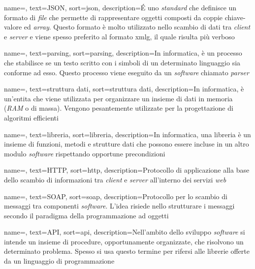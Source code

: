{
    name=,
    text=JSON,
    sort=json,
    description={\'E uno \textit{standard} che definisce un formato di \textit{file} che permette di rappresentare oggetti composti da coppie chiave-valore ed \textit{array}. Questo formato è molto utilizzato nello scambio di dati tra \textit{client} e \textit{server} e viene spesso preferito al formato \gls{xmlg}, il quale risulta più verboso}
}

{
    name=,
    text=parsing,
    sort=parsing,
    description={In informatica, è un processo che stabilisce se un testo scritto con i simboli di un determinato linguaggio sia conforme ad esso. Questo processo viene eseguito da un \textit{software} chiamato \textit{parser}}
}

{
    name=,
    text=struttura dati,
    sort=struttura dati,
    description={In informatica, è un'entita che viene utilizzata per organizzare un insieme di dati in memoria (\textit{RAM} o di massa). Vengono pesantemente utilizzate per la progettazione di algoritmi efficienti}
}

{
    name=,
    text=libreria,
    sort=libreria,
    description={In informatica, una libreria è un insieme di funzioni, metodi e strutture dati che possono essere incluse in un altro modulo \textit{software} rispettando opportune precondizioni}
}

{
    name=,
    text=HTTP,
    sort=http,
    description={Protocollo di applicazione alla base dello scambio di informazioni tra \textit{client} e \textit{server} all'interno dei servizi \textit{web}}
}

{
    name=,
    text=SOAP,
    sort=soap,
    description={Protocollo per lo scambio di messaggi tra componenti \textit{software}. L'idea risiede nello strutturare i messaggi secondo il paradigma della programmazione ad oggetti}
}

{
    name=,
    text=API,
    sort=api,
    description={Nell'ambito dello sviluppo \textit{software} si intende un insieme di procedure, opportunamente organizzate, che risolvono un determinato problema. Spesso si usa questo termine per rifersi alle librerie offerte da un linguaggio di programmazione}
}

